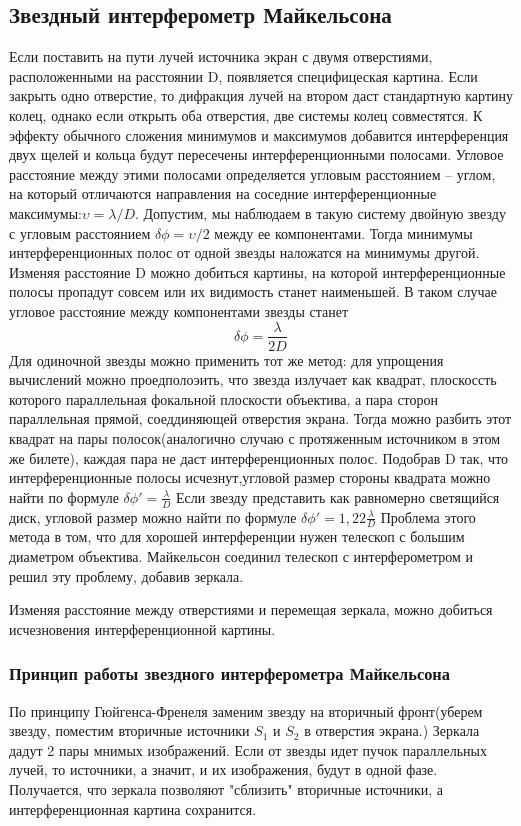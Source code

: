 \subsection{Звездный интерферометр Майкельсона}
Если поставить на пути лучей источника экран с двумя отверстиями, расположенными на расстоянии D, появляется специфицеская картина. Если закрыть одно отверстие, то дифракция лучей на втором даст стандартную картину колец, однако если открыть оба отверстия, две системы колец совместятся. К эффекту обычного сложения минимумов и максимумов добавится интерференция двух щелей и кольца будут пересечены интерференционными полосами. Угловое расстояние между этими полосами определяется угловым расстоянием -- углом, на который отличаются направления на соседние интерференционные максимумы:$\upsilon=\lambda/D$.
Допустим, мы наблюдаем в такую систему двойную звезду с угловым расстоянием $\delta\phi=\upsilon/2$ между ее компонентами. Тогда минимумы интерференционных полос от одной звезды наложатся на минимумы другой. Изменяя расстояние D можно добиться картины, на которой интерференционные полосы пропадут совсем или их видимость станет наименьшей.  В таком случае угловое расстояние между компонентами звезды станет 
$$\delta\phi=\frac{\lambda}{2D}$$
Для одиночной звезды можно применить тот же метод: для упрощения вычислений можно проедполоэить, что звезда излучает как квадрат, плоскоссть которого параллельная фокальной плоскости объектива, а пара сторон параллельная прямой, соеддиняющей отверстия экрана. Тогда можно разбить этот квадрат на пары полосок(аналогично случаю с протяженным источником в этом же билете), каждая пара не даст интерференционных полос. Подобрав D так, что интерференционные полосы исчезнут,угловой размер стороны квадрата можно найти по формуле   $\delta\phi'=\frac{\lambda}{D}$
Если звезду представить как равномерно светящийся диск, угловой размер можно найти по формуле $\delta\phi'=1,22\frac{\lambda}{D}$
Проблема этого метода в том, что для хорошей интерференции нужен телескоп с большим диаметром объектива. Майкельсон соединил телескоп с интерферометром и решил эту проблему, добавив зеркала.
\begin{figure}[H]
\center{\texttt{[image: 9]}}
\end{figure}
Изменяя расстояние между отверстиями и перемещая зеркала, можно добиться исчезновения интерференционной картины.
\subsubsection{Принцип работы звездного интерферометра Майкельсона}
По принципу Гюйгенса-Френеля заменим звезду на вторичный фронт(уберем звезду, поместим вторичные источники $S_1$ и $S_2$ в отверстия экрана.) Зеркала дадут 2 пары мнимых изображений. Если от звезды идет пучок параллельных лучей, то источники, а значит, и их изображения, будут в одной фазе. Получается, что зеркала позволяют "сблизить" вторичные источники, а интерференционная картина сохранится. 

